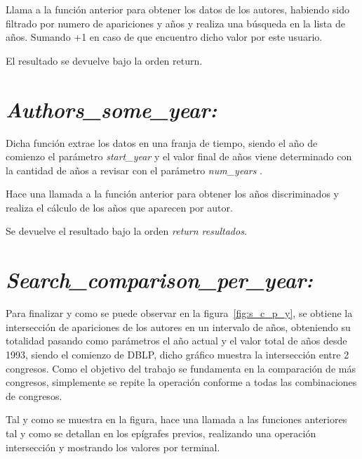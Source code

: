 \documentclass[a4paper, 12pt]{book}
\begin{document}
Llama a la función anterior para obtener los datos de los autores, habiendo sido filtrado por numero de apariciones y años y realiza una búsqueda en la lista de años. Sumando +1 en caso de que encuentro dicho valor por este usuario.

El resultado se devuelve bajo la orden return.

\section{\textit{Authors\_some\_year:}}

Dicha función extrae los datos en una franja de tiempo, siendo el año de comienzo el parámetro \textit{start\_year} y el valor final de años viene determinado con la cantidad de años a revisar con el parámetro \textit{num\_years} .

Hace una llamada a la función anterior para obtener los años discriminados y realiza el cálculo de los años que aparecen por autor.

Se devuelve el resultado bajo la orden \textit{return resultados}.

\section{\textit{Search\_comparison\_per\_year:}}
Para finalizar y como se puede observar en la figura~\ref{fig:s_c_p_y}, se obtiene la intersección de apariciones de los autores en un intervalo de años, obteniendo su totalidad pasando como parámetros el año actual y el valor total de años desde 1993, siendo el comienzo de DBLP, dicho gráfico muestra la intersección entre 2 congresos. Como el objetivo del trabajo se fundamenta en la comparación de más congresos, simplemente se repite la operación conforme a todas las combinaciones de congresos.

Tal y como se muestra en la figura, hace una llamada a las funciones anteriores tal y como se detallan en los epígrafes previos, realizando una operación intersección y mostrando los valores por terminal.
\end{document}
